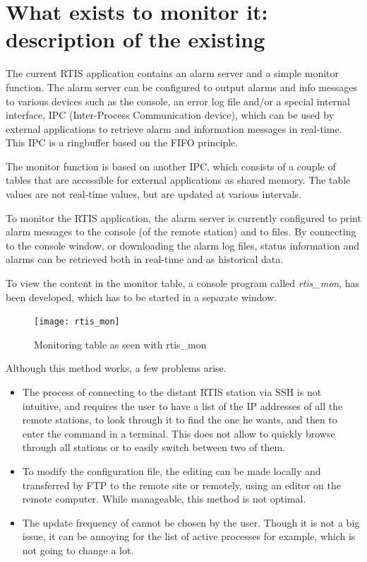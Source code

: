 \documentclass{themeensg}
\begin{document}
\clearpage

\section{What exists to monitor it: description of the existing}

The current RTIS application contains an alarm server and a simple monitor function. The alarm server can be configured to output alarms and info messages to various devices such as the console, an error log file and/or a special internal interface, IPC (Inter-Process Communication device), which can be used by external applications to retrieve alarm and information messages in real-time. This IPC is a ringbuffer based on the FIFO principle. 

The monitor function is based on another IPC, which consists of a couple of tables that are accessible for external applications as shared memory. The table values are not real-time values, but are updated at various intervals.

To monitor the RTIS application, the alarm server is currently configured to print alarm messages to the console (of the remote station) and to files. By connecting to the console window, or downloading the alarm log files, status information and alarms can be retrieved both in real-time and as historical data.

To view the content in the monitor table, a console program called \textit{rtis\_mon}, has been developed, which has to be started in a separate window.

\begin{figure}[ht]
	\centering
	\texttt{[image: rtis\_mon]}
	\caption{Monitoring table as seen with rtis\_mon}
\end{figure}

Although this method works, a few problems arise.
\begin{itemize}
	\item The process of connecting to the distant RTIS station via SSH is not intuitive, and requires the user to have a list of the IP addresses of all the remote stations, to look through it to find the one he wants, and then to enter the command in a terminal. This does not allow to quickly browse through all stations or to easily switch between two of them.
	\item To modify the configuration file, the editing can be made locally and transferred by FTP to the remote site or remotely, using an editor on the remote computer. While manageable, this method is not optimal.
	\item The update frequency of cannot be chosen by the user. Though it is not a big issue, it can be annoying for the list of active processes for example, which is not going to change a lot.
\end{itemize}
\end{document}

